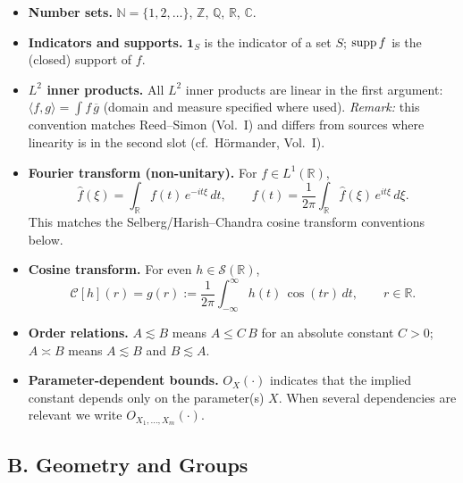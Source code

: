 \begin{itemize}
  \item \textbf{Number sets.} $\mathbb{N}=\{1,2,\dots\}$, $\mathbb{Z}$, $\mathbb{Q}$, $\mathbb{R}$, $\mathbb{C}$.
  \item \textbf{Indicators and supports.} $\mathbf{1}_S$ is the indicator of a set $S$; $\operatorname{supp} f$ is the (closed) support of $f$.
  \item \textbf{$L^2$ inner products.} All $L^2$ inner products are linear in the first argument:
        $\langle f,g\rangle=\int f\,\overline{g}$ (domain and measure specified where used).
        \emph{Remark:} this convention matches Reed–Simon (Vol.~I) and differs from sources where linearity is in the second slot (cf.\ Hörmander, Vol.~I).
  \item \textbf{Fourier transform (non-unitary).} For $f\in L^1(\mathbb{R})$,
        \[
           \widehat{f}(\xi)=\int_{\mathbb{R}} f(t)\,e^{-i t \xi}\,dt,
           \qquad
           f(t)=\frac{1}{2\pi}\int_{\mathbb{R}} \widehat{f}(\xi)\,e^{i t \xi}\,d\xi.
        \]
        This matches the Selberg/Harish--Chandra cosine transform conventions below.
  \item \textbf{Cosine transform.} For even $h\in\mathcal{S}(\mathbb{R})$,
        \[
          \mathcal{C}[h](r)=g(r):=\frac{1}{2\pi}\int_{-\infty}^{\infty} h(t)\,\cos(t r)\,dt,
          \qquad r\in\mathbb{R}.
        \]
  \item \textbf{Order relations.} $A\lesssim B$ means $A\le C\,B$ for an absolute constant $C>0$;
        $A\asymp B$ means $A\lesssim B$ and $B\lesssim A$.
  \item \textbf{Parameter-dependent bounds.} $O_X(\cdot)$ indicates that the implied constant depends only on the parameter(s) $X$.
        When several dependencies are relevant we write $O_{X_1,\dots,X_m}(\cdot)$.
\end{itemize}

\subsection*{B. Geometry and Groups}

